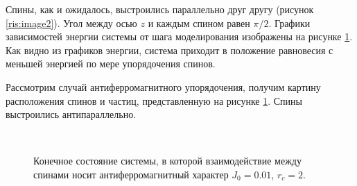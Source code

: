 \documentclass[14pt,a4paper,report]{ncc}
\begin{document}
Спины, как и ожидалось, выстроились параллельно друг другу (рисунок \ref{ris:image2}). Угол между осью $z$ и каждым спином равен $\pi/2$.
Графики зависимостей энергии системы от шага моделирования изображены на рисунке \ref{ris:image5}. Как видно из графиков энергии, система приходит в положение равновесия с меньшей энергией по мере упорядочения спинов.
\



Рассмотрим случай антиферромагнитного упорядочения, получим картину расположения спинов и частиц, представленную на рисунке \ref{ris:image5}. Спины выстроились антипараллельно.

\
\begin{figure}[h]
\begin{minipage}[h]{0.49\linewidth}
\end{minipage}
\hfill
\begin{minipage}[h]{0.49\linewidth}
\end{minipage}
\caption{Конечное состояние системы, в которой взаимодействие между спинами носит антиферромагнитный характер $J_0=0.01$, $r_c=2$.}
\label{ris:image5}
\end{figure}
\
\end{document}
